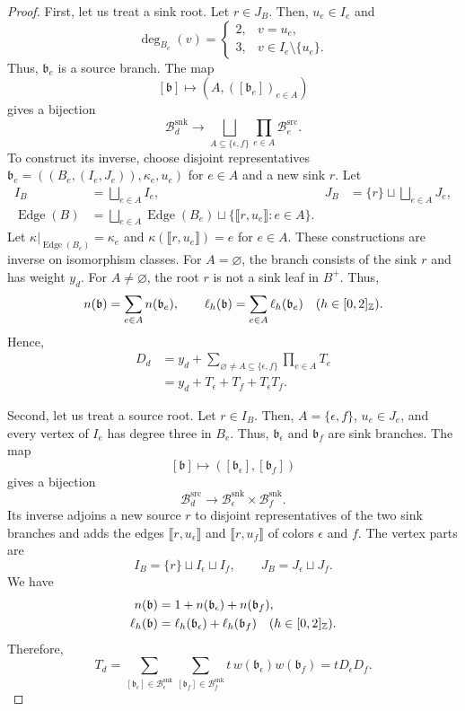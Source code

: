 \begin{proof}
First, let us treat a sink root. Let $r\in J_B$.
Then, $u_e\in I_e$ and
\[
 \deg_{B_e}(v)=
 \begin{cases}
 2,&v=u_e,\\
 3,&v\in I_e\setminus\{u_e\}.
 \end{cases}
\]
Thus, $\mathfrak b_e$ is a source branch.
The map
\[
 [\mathfrak b]\longmapsto(A,([\mathfrak b_e])_{e\in A})
\]
gives a bijection
\[
 \mathcal B_d^{\mathrm{snk}}
 \longrightarrow
 \bigsqcup_{A\subseteq\{\epsilon,f\}}
 \prod_{e\in A}\mathcal B_e^{\mathrm{src}}.
\]
To construct its inverse, choose disjoint representatives
$\mathfrak b_e=((B_e,(I_e,J_e)),\kappa_e,u_e)$ for $e\in A$ and a new sink $r$.
Let
\[
\begin{aligned}
 I_B&=\bigsqcup_{e\in A}I_e,&
 J_B&=\{r\}\sqcup\bigsqcup_{e\in A}J_e,\\
 \operatorname{Edge}(B)&=
 \bigsqcup_{e\in A}\operatorname{Edge}(B_e)
 \sqcup\{\llbracket r,u_e\rrbracket:e\in A\}.&&
\end{aligned}
\]
Let $\kappa|_{\operatorname{Edge}(B_e)}=\kappa_e$ and
$\kappa(\llbracket r,u_e\rrbracket)=e$ for $e\in A$.
These constructions are inverse on isomorphism classes.
For $A=\varnothing$, the branch consists of the sink $r$ and has weight $y_d$.
For $A\ne\varnothing$, the root $r$ is not a sink leaf in $B^+$. Thus,
\[
 n(\mathfrak b)=\sum_{e\in A}n(\mathfrak b_e),\qquad
 \ell_h(\mathfrak b)=\sum_{e\in A}\ell_h(\mathfrak b_e)
 \quad(h\in[0,2]_{\mathbb Z}).
\]
Hence,
\[
\begin{aligned}
 D_d
 &=y_d+\sum_{\varnothing\ne A\subseteq\{\epsilon,f\}}
   \prod_{e\in A}T_e\\
 &=y_d+T_\epsilon+T_f+T_\epsilon T_f.
\end{aligned}
\]

Second, let us treat a source root. Let $r\in I_B$.
Then, $A=\{\epsilon,f\}$, $u_e\in J_e$, and every vertex of $I_e$ has degree three in $B_e$.
Thus, $\mathfrak b_\epsilon$ and $\mathfrak b_f$ are sink branches.
The map
\[
 [\mathfrak b]\longmapsto([\mathfrak b_\epsilon],[\mathfrak b_f])
\]
gives a bijection
\[
 \mathcal B_d^{\mathrm{src}}
 \longrightarrow\mathcal B_\epsilon^{\mathrm{snk}}\times\mathcal B_f^{\mathrm{snk}}.
\]
Its inverse adjoins a new source $r$ to disjoint representatives of the two sink branches and adds the edges
$\llbracket r,u_\epsilon\rrbracket$ and $\llbracket r,u_f\rrbracket$ of colors $\epsilon$ and $f$.
The vertex parts are
\[
 I_B=\{r\}\sqcup I_\epsilon\sqcup I_f,\qquad
 J_B=J_\epsilon\sqcup J_f.
\]
We have
\[
\begin{aligned}
 n(\mathfrak b)&=1+n(\mathfrak b_\epsilon)+n(\mathfrak b_f),\\
 \ell_h(\mathfrak b)&=\ell_h(\mathfrak b_\epsilon)+\ell_h(\mathfrak b_f)
 \quad(h\in[0,2]_{\mathbb Z}).
\end{aligned}
\]
Therefore,
\[
 T_d=\sum_{[\mathfrak b_\epsilon]\in\mathcal B_\epsilon^{\mathrm{snk}}}
     \sum_{[\mathfrak b_f]\in\mathcal B_f^{\mathrm{snk}}}
     t\,w(\mathfrak b_\epsilon)w(\mathfrak b_f)
 =tD_\epsilon D_f.
\]


\end{proof}
